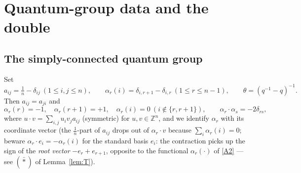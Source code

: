 \documentclass[11pt]{article}
\theoremstyle{definition}
\theoremstyle{remark}
\newcommand{\Z}{\mathbb{Z}}
\newcommand{\del}{\delta}
\newcommand{\tht}{\theta}
\begin{document}
\section{Quantum-group data and the double}\label{sec:qg}

\subsection{The simply-connected quantum group}

Set
\[
a_{ij}=\tfrac1n-\del_{ij}\ (1\le i,j\le n),\qquad
\alpha_r(i)=\del_{i,r+1}-\del_{i,r}\ (1\le r\le n-1),\qquad
\tht=(q^{-1}-q)^{-1}.
\]
Then $a_{ij}=a_{ji}$ and
\begin{equation}
\alpha_r(r)=-1,\quad \alpha_r(r+1)=+1,\quad \alpha_r(i)=0\
(i\notin\{r,r+1\}),\qquad \alpha_r\cdot\alpha_s=-2\del_{rs},
\label{A2}\tag{A2}
\end{equation}
where $u\cdot v=\sum_{i,j}u_iv_ja_{ij}$ (symmetric) for
$u,v\in\Z^n$, and we identify $\alpha_r$ with its coordinate vector
(the $\tfrac1n$-part of $a_{ij}$ drops out of $\alpha_r\cdot v$
because $\sum_i\alpha_r(i)=0$; beware
$\alpha_r\cdot e_i=-\alpha_r(i)$ for the standard basis $e_i$:
the contraction picks up the sign of the \emph{root vector}
$-e_r+e_{r+1}$, opposite to the functional $\alpha_r(\cdot)$
of \eqref{A2} — see $(\bar\ast)$ of Lemma~\ref{lem:T}).
\end{document}
